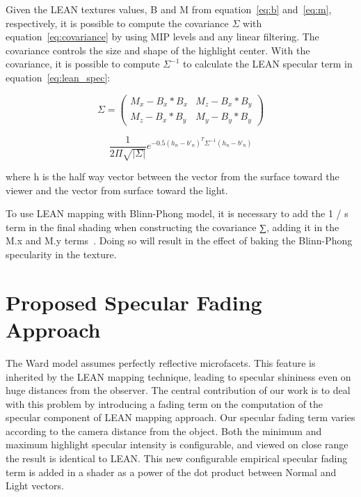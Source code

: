 \documentclass[10pt, conference]{IEEEtran}
\begin{document}
Given the LEAN textures values, B and M from equation~\ref{eq:b} and~\ref{eq:m}, respectively, it is possible to compute the covariance $\Sigma$ with equation~\ref{eq:covariance} by using MIP levels and any linear filtering. The covariance controls the size and shape of the highlight center. With the covariance, it is possible to compute $\Sigma^{-1}$ to calculate the LEAN specular term in equation~\ref{eq:lean_spec}:

\begin{equation}
\label{eq:covariance}
\Sigma = \left( \begin{smallmatrix} M_{x} - B_{x} * B_{x} & M_{z} - B_{x} * B_{y}\\ M_{z} - B_{x} * B_{y} & M_{y} - B_{y} * B_{y} \end{smallmatrix} \right)
\end{equation}

\begin{equation}
\label{eq:lean_spec}
\dfrac{1}{2\Pi\sqrt{|\Sigma|}}e^{-0.5(h_{n} - b'_{n})^{T} \Sigma^{-1}(h_{n} - b'_{n})}
\end{equation}

where h is the half way vector between the vector from the surface toward the viewer and the vector from surface toward the light.

To use LEAN mapping with Blinn-Phong model, it is necessary to add the 1 / s term in the final shading when constructing the covariance ∑, adding it in the M.x and M.y terms~\cite{Olano:2010:LM:1730804.1730834}. Doing so will result in the effect of baking the Blinn-Phong specularity in the texture.


\section{Proposed Specular Fading Approach}
\label{sec:specular_fading}
%
The Ward model assumes perfectly reflective microfacets. This feature is inherited by the LEAN mapping technique, leading to specular shininess even on huge distances from the observer. The central contribution of our work is to deal with this problem by introducing a fading term on the computation of the specular component of LEAN mapping approach. Our specular fading term varies according to the camera distance from the object. Both the minimum and maximum highlight specular intensity is configurable, and viewed on close range the result is identical to LEAN. This new configurable empirical specular fading term is added in a shader as a power of the dot product between Normal and Light vectors.
\end{document}
